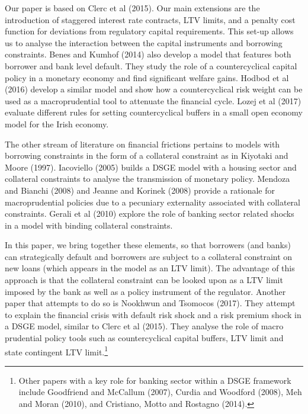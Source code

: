 \documentclass[12pt]{article}
\numberwithin{equation}{section}
\begin{document}
Our paper is based on Clerc et al (2015). Our main extensions are the introduction of staggered interest rate contracts, LTV limits, and a penalty cost function for deviations from regulatory capital requirements. This set-up allows us to analyse the interaction between the capital instruments and borrowing constraints. Benes and Kumhof (2014) also develop a model that features both borrower and bank level default. They study the role of a countercyclical capital policy in a monetary economy and find significant welfare gains. Hodbod et al (2016) develop a similar model and show how a countercyclical risk weight can be used as a macroprudential tool to attenuate the financial cycle. Lozej et al (2017) evaluate different rules for setting countercyclical buffers in a small open economy model for the Irish economy.

The other stream of literature on financial frictions pertains to models with borrowing constraints in the form of a collateral constraint as in Kiyotaki and Moore (1997). Iacoviello (2005) builds a DSGE model with a housing sector and collateral constraints to analyse the transmission of monetary policy. Mendoza and Bianchi (2008) and Jeanne and Korinek (2008) provide a rationale for macroprudential policies due to a pecuniary externality associated with collateral constraints. Gerali et al (2010) explore the role of banking sector related shocks in a model with binding collateral constraints.

In this paper, we bring together these elements, so that borrowers (and banks) can strategically default and borrowers are subject to a collateral constraint on new loans (which appears in the model as an LTV limit). The advantage of this approach is that the collateral constraint can be looked upon as a LTV limit imposed by the bank as well as a policy instrument of the regulator. Another paper that attempts to do so is Nookhwun and Tsomocos (2017). They attempt to explain the financial crisis with default risk shock and a risk premium shock in a DSGE model, similar to Clerc et al (2015). They analyse the role of macro prudential policy tools such as countercyclical capital buffers, LTV limit and state contingent LTV limit.\footnote{Other papers with a key role for banking sector within a DSGE framework include Goodfriend and McCallum (2007), Curdia and Woodford (2008), Meh and Moran (2010), and Cristiano, Motto and Rostagno (2014).}
\end{document}
